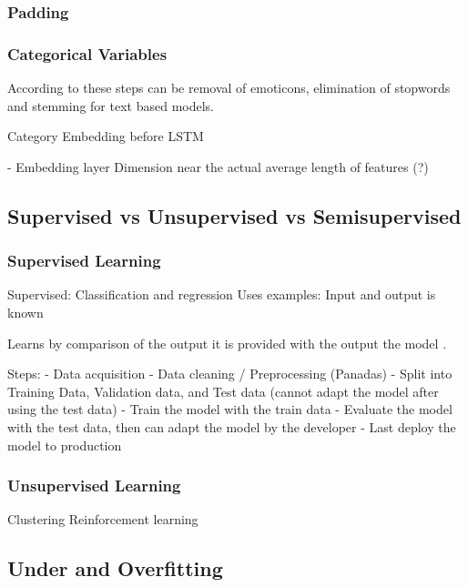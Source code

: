 \subsubsection{Padding}


\subsubsection{Categorical Variables}

According to \cite{alam2019impact} these steps can be removal of emoticons, elimination of stopwords and stemming for text based models.

Category Embedding before LSTM


- Embedding layer
Dimension near the actual average length of features (?)

\subsection{Supervised vs Unsupervised vs Semisupervised}

\subsubsection{Supervised Learning}
Supervised: Classification and regression
Uses  examples: Input and output is known

Learns by comparison of the output it is provided with the output the model .

Steps:
- Data acquisition
- Data cleaning / Preprocessing (Panadas)
- Split into Training Data, Validation data, and Test data (cannot adapt the model after using the test data)
- Train the model with the train data
- Evaluate the model with the test data, then can adapt the model by the developer
- Last deploy the model to production

\subsubsection{Unsupervised Learning}
Clustering
Reinforcement learning

\subsection{Under and Overfitting}
